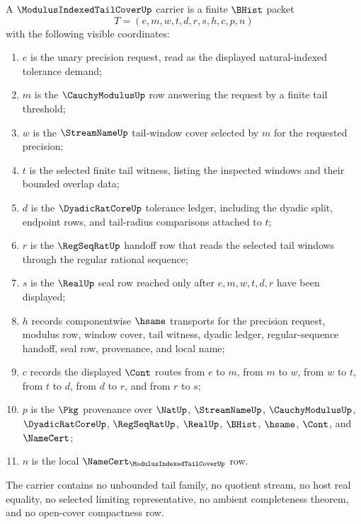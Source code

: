 \begin{definition}
\label{def:modulus-indexed-tail-cover-carrier}
A $\ModulusIndexedTailCoverUp$ carrier is a finite $\BHist$ packet
$$
T=(e,m,w,t,d,r,s,h,c,p,n)
$$
with the following visible coordinates:
\begin{enumerate}
\item $e$ is the unary precision request, read as the displayed natural-indexed tolerance demand;
\item $m$ is the $\CauchyModulusUp$ row answering the request by a finite tail threshold;
\item $w$ is the $\StreamNameUp$ tail-window cover selected by $m$ for the requested precision;
\item $t$ is the selected finite tail witness, listing the inspected windows and their bounded overlap data;
\item $d$ is the $\DyadicRatCoreUp$ tolerance ledger, including the dyadic split, endpoint rows, and tail-radius comparisons attached to $t$;
\item $r$ is the $\RegSeqRatUp$ handoff row that reads the selected tail windows through the regular rational sequence;
\item $s$ is the $\RealUp$ seal row reached only after $e,m,w,t,d,r$ have been displayed;
\item $h$ records componentwise $\hsame$ transports for the precision request, modulus row, window cover, tail witness, dyadic ledger, regular-sequence handoff, seal row, provenance, and local name;
\item $c$ records the displayed $\Cont$ routes from $e$ to $m$, from $m$ to $w$, from $w$ to $t$, from $t$ to $d$, from $d$ to $r$, and from $r$ to $s$;
\item $p$ is the $\Pkg$ provenance over $\NatUp$, $\StreamNameUp$, $\CauchyModulusUp$, $\DyadicRatCoreUp$, $\RegSeqRatUp$, $\RealUp$, $\BHist$, $\hsame$, $\Cont$, and $\NameCert$;
\item $n$ is the local $\NameCert_{\ModulusIndexedTailCoverUp}$ row.
\end{enumerate}
The carrier contains no unbounded tail family, no quotient stream, no host real equality, no selected limiting representative, no ambient completeness theorem, and no open-cover compactness row.
\end{definition}

